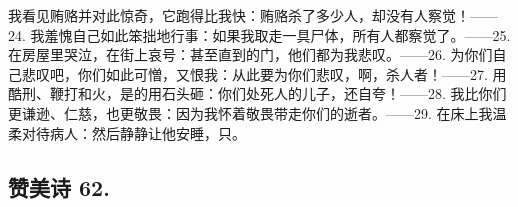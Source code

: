 我看见贿赂并对此惊奇，它跑得比我快：贿赂杀了多少人，却没有人察觉！——\newline{}24. 我羞愧自己如此笨拙地行事：如果我取走一具尸体，所有人都察觉了。——\newline{}25. 在房屋里哭泣，在街上哀号：甚至直到的门，他们都为我悲叹。——\newline{}26. 为你们自己悲叹吧，你们如此可憎，又恨我：从此要为你们悲叹，啊，杀人者！——\newline{}27. 用酷刑、鞭打和火，是的用石头砸：你们处死人的儿子，还自夸！——\newline{}28. 我比你们更谦逊、仁慈，也更敬畏：因为我怀着敬畏带走你们的逝者。——\newline{}29. 在床上我温柔对待病人：然后静静让他安睡，只。\par


\subsection{赞美诗 62.}

